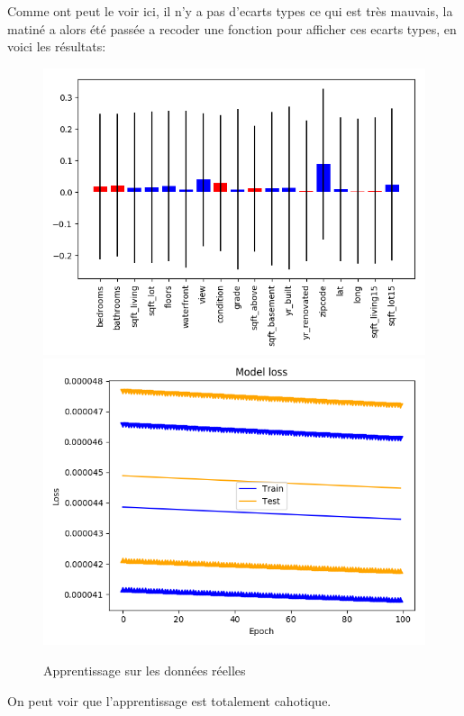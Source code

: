 Comme ont peut le voir ici,
il n'y a pas d'ecarts types ce qui est très mauvais,
la matiné a alors été passée a recoder une fonction pour afficher ces ecarts types, en voici les résultats:
\begin{figure}[H]
    \center
    \includegraphics[height=\petit]{sources/data/Obj2/real/graphs/default_100_100.png}
    \includegraphics[height=\petit]{sources/data/Obj2/real/graphs/default_100_100_learn.png}
	\caption{Apprentissage sur les données réelles}
	\label{def_100_100}
\end{figure}
On peut voir que l'apprentissage est totalement cahotique.

